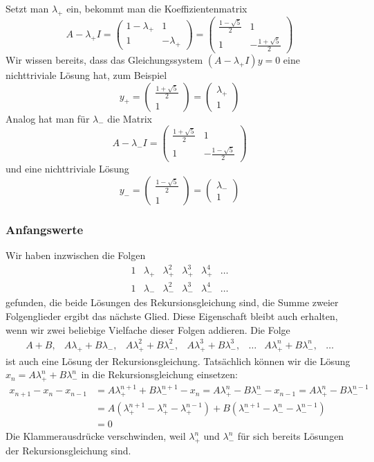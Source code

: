 Setzt man $\lambda_+$ ein, bekommt man die Koeffizientenmatrix
\[
A-\lambda_+I=
\begin{pmatrix}
1-\lambda_+&1\\1&-\lambda_+
\end{pmatrix}
=
\begin{pmatrix}
\frac{1-\sqrt{5}}2&1\\1&-\frac{1+\sqrt{5}}2
\end{pmatrix}
\]
Wir wissen bereits, dass das Gleichungssystem $(A-\lambda_+I)y=0$
eine nichttriviale Lösung hat, zum Beispiel
\[
y_+=\begin{pmatrix}
\frac{1+\sqrt{5}}2\\1
\end{pmatrix}
=\begin{pmatrix}
\lambda_+\\1
\end{pmatrix}
\]
Analog hat man für $\lambda_-$ die Matrix
\[
A-\lambda_-I=
\begin{pmatrix}
\frac{1+\sqrt{5}}2&1\\
1&-\frac{1-\sqrt{5}}2
\end{pmatrix}
\]
und eine nichttriviale Lösung
\[
y_-=\begin{pmatrix}
\frac{1-\sqrt{5}}2\\
1
\end{pmatrix}=
\begin{pmatrix}
\lambda_-\\1
\end{pmatrix}
\]
\subsubsection{Anfangswerte}
Wir haben inzwischen die Folgen
\[
\begin{matrix}
1&\lambda_+&\lambda_+^2&\lambda_+^3&\lambda_+^4&\dots\\
1&\lambda_-&\lambda_-^2&\lambda_-^3&\lambda_-^4&\dots
\end{matrix}
\]
gefunden, die beide Lösungen des Rekursionsgleichung sind, die Summe
zweier Folgenglieder ergibt das nächste Glied.
Diese Eigenschaft bleibt auch erhalten, wenn wir zwei beliebige
Vielfache dieser Folgen addieren.
Die Folge
\[
\begin{matrix}
A+B,
&A\lambda_++B\lambda_-,
&A\lambda_+^2+B\lambda_-^2,
&A\lambda_+^3+B\lambda_-^3,
&\dots
&A\lambda_+^n+B\lambda_-^n,
&\dots
\end{matrix}
\]
ist auch eine Lösung der Rekursionsgleichung.
Tatsächlich können
wir die Lösung
$x_n=A\lambda_+^n + B\lambda_-^n$
in die Rekursionsgleichung einsetzen:
\begin{align*}
x_{n+1}-x_n-x_{n-1}
&=A\lambda_+^{n+1} + B\lambda_-^{n+1}
-x_n=A\lambda_+^n - B\lambda_-^n
-x_{n-1}=A\lambda_+^n - B\lambda_-^{n-1}
\\
&=
A(\lambda_+^{n+1}-\lambda_+^n-\lambda_+^{n-1})
+
B(\lambda_-^{n+1}-\lambda_-^n-\lambda_-^{n-1})
\\
&=0
\end{align*}
Die Klammerausdrücke verschwinden, weil $\lambda_+^n$ und $\lambda_-^n$
für sich bereits Lösungen der Rekursionsgleichung sind.

